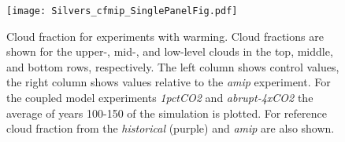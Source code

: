 \documentclass[draft]{agujournal2019}
\begin{document}

\begin{figure}
  \centering
  \texttt{[image: Silvers\_cfmip\_SinglePanelFig.pdf]}
  \caption{Cloud fraction for experiments with warming.  Cloud fractions are shown for the upper-, mid-, and low-level 
  clouds in the top, middle, and bottom rows, respectively.  The left column shows control values, the right column
  shows values relative to the \textit{amip} experiment.  For the coupled model experiments
 \textit{1pctCO2} and \textit{abrupt-4xCO2} the average of years 100-150 of the simulation is plotted.  
  For reference cloud fraction from the 
 \textit{historical} (purple) and \textit{amip} are also shown.}
  \label{fig:CF_warming}
\end{figure}
\end{document}
